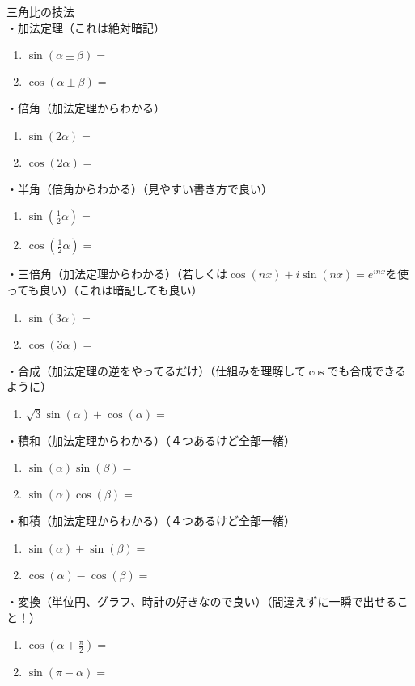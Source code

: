 \documentclass[12pt,a4paper]{jsarticle}
\begin{document}
三角比の技法\\
・加法定理（これは絶対暗記）
\begin{enumerate}
    \item $\sin(\alpha\pm\beta)=$
    \item $\cos(\alpha\pm\beta)=$
\end{enumerate}
・倍角（加法定理からわかる）
\begin{enumerate}
    \item $\sin(2\alpha)=$
    \item $\cos(2\alpha)=$
\end{enumerate}
・半角（倍角からわかる）（見やすい書き方で良い）
\begin{enumerate}
    \item $\sin(\frac{1}{2}\alpha)=$
    \item $\cos(\frac{1}{2}\alpha)=$
\end{enumerate}
・三倍角（加法定理からわかる）（若しくは$\cos(nx)+i\sin(nx)=e^{inx}$を使っても良い）（これは暗記しても良い）
\begin{enumerate}
    \item $\sin(3\alpha)=$
    \item $\cos(3\alpha)=$
\end{enumerate}
・合成（加法定理の逆をやってるだけ）（仕組みを理解して$\cos$でも合成できるように）
\begin{enumerate}
    \item $\sqrt{3}\sin(\alpha)+\cos(\alpha)=$
\end{enumerate}
・積和（加法定理からわかる）（４つあるけど全部一緒）
\begin{enumerate}
    \item $\sin(\alpha)\sin(\beta)=$
    \item $\sin(\alpha)\cos(\beta)=$
\end{enumerate}
・和積（加法定理からわかる）（４つあるけど全部一緒）
\begin{enumerate}
    \item $\sin(\alpha)+\sin(\beta)=$
    \item $\cos(\alpha)-\cos(\beta)=$
\end{enumerate}
・変換（単位円、グラフ、時計の好きなので良い）（間違えずに一瞬で出せること！）
\begin{enumerate}
    \item $\cos(\alpha+\frac{\pi}{2})=$
    \item $\sin(\pi-\alpha)=$
\end{enumerate}
\end{document}

